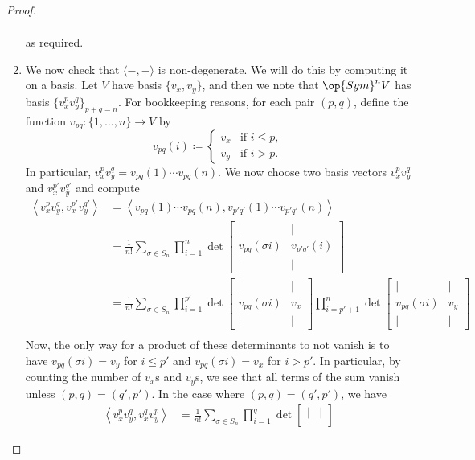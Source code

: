 \documentclass[../notes.tex]{subfiles}
\begin{document}
\begin{proof}
\begin{enumerate}
\begin{align*}
		\end{align*}
		as required.
		\item We now check that $\langle-,-\rangle$ is non-degenerate. We will do this by computing it on a basis. Let $V$ have basis $\{v_x,v_y\}$, and then we note that $\op{Sym}^nV$ has basis $\{v_x^pv_y^q\}_{p+q=n}$. For bookkeeping reasons, for each pair $(p,q)$, define the function $v_{pq}\colon\{1,\ldots,n\}\to V$ by
		\[v_{pq}(i)\coloneqq\begin{cases}
			v_x & \text{if }i \le p, \\
			v_y & \text{if }i > p.
		\end{cases}\]
		In particular, $v_x^pv_y^q=v_{pq}(1)\cdots v_{pq}(n)$. We now choose two basis vectors $v_x^pv_y^q$ and $v_x^{p'}v_y^{q'}$ and compute
		\begin{align*}
			\left\langle v_x^pv_y^q,v_x^{p'}v_y^{q'}\right\rangle &= \left\langle v_{pq}(1)\cdots v_{pq}(n),v_{p'q'}(1)\cdots v_{p'q'}(n)\right\rangle \\
			&= \frac1{n!}\sum_{\sigma\in S_n}\prod_{i=1}^n\det\begin{bmatrix}
				| & | \\
				v_{pq}(\sigma i) & v_{p'q'}(i) \\
				| & |
			\end{bmatrix} \\
			&= \frac1{n!}\sum_{\sigma\in S_n}\prod_{i=1}^{p'}\det\begin{bmatrix}
				| & | \\
				v_{pq}(\sigma i) & v_x \\
				| & |
			\end{bmatrix}\prod_{i=p'+1}^{n}\det\begin{bmatrix}
				| & | \\
				v_{pq}(\sigma i) & v_y \\
				| & |
			\end{bmatrix} \\
		\end{align*}
		Now, the only way for a product of these determinants to not vanish is to have $v_{pq}(\sigma i)=v_y$ for $i\le p'$ and $v_{pq}(\sigma i)=v_x$ for $i>p'$. In particular, by counting the number of $v_x$s and $v_y$s, we see that all terms of the sum vanish unless $(p,q)=(q',p')$. In the case where $(p,q)=(q',p')$, we have
		\begin{align*}
			\left\langle v_x^pv_y^q,v_x^qv_y^p\right\rangle &= \frac1{n!}\sum_{\sigma\in S_n}\prod_{i=1}^{q}\det\begin{bmatrix}
				| & | \\

\end{bmatrix}
\end{align*}
\end{enumerate}
\end{proof}
\end{document}
